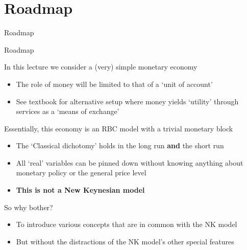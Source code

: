 \section{Roadmap}

\begin{frame}

\begin{center}
{\LARGE Roadmap}
\end{center}

\end{frame}


	
\begin{frame}{Roadmap}

In this lecture we consider a (very) simple monetary economy
\begin{itemize}
\item	The role of money will be limited to that of a `unit of account'
\item	See textbook for alternative setup where money yields `utility' through services as a `means of exchange'
\end{itemize}

\vspace{1mm}
Essentially, this economy is an RBC model with a trivial monetary block
\begin{itemize}
\item	The `Classical dichotomy' holds in the long run \textbf{and} the short run
\item	All `real' variables can be pinned down without knowing anything about monetary policy or the general price level
\item	\textbf{This is not a New Keynesian model}
\end{itemize}

\vspace{1mm}
So why bother?
\begin{itemize}
\item	To introduce various concepts that are in common with the NK model
\item	But without the distractions of the NK model's other special features
\end{itemize}

\end{frame}

